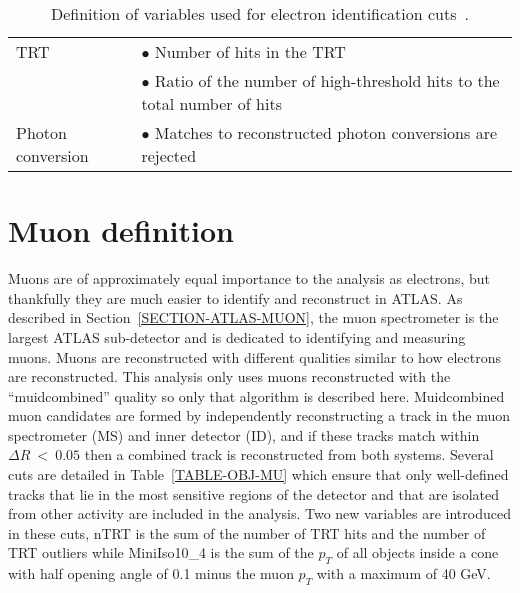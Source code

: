 \begin{table}
\begin{center}
\begin{tabular}{|p{4cm}|p{11cm}|}
\hline
TRT & $\bullet$ Number of hits in the TRT \\
    & $\bullet$ Ratio of the number of high-threshold hits to the total number of hits \\
\hline
Photon conversion & $\bullet$ Matches to reconstructed photon conversions are rejected \\
\hline
\end{tabular}
\caption{Definition of variables used for electron identification cuts~\cite{Electrons}.}
\label{TABLE-OBJ-ELQUALITY}
\end{center}
\end{table}

\section{Muon definition}
\label{SECTION-OBJ-MU}
Muons are of approximately equal importance to the analysis as electrons, but thankfully they are much easier to identify and reconstruct in ATLAS. As described in Section~\ref{SECTION-ATLAS-MUON}, the muon spectrometer is the largest ATLAS sub-detector and is dedicated to identifying and measuring muons. Muons are reconstructed with different qualities similar to how electrons are reconstructed. This analysis only uses muons reconstructed with the ``muidcombined'' quality so only that algorithm is described here. Muidcombined muon candidates are formed by independently reconstructing a track in the muon spectrometer (MS) and inner detector (ID), and if these tracks match within $\Delta R\ <\ 0.05$ then a combined track is reconstructed from both systems. Several cuts are detailed in Table~\ref{TABLE-OBJ-MU} which ensure that only well-defined tracks that lie in the most sensitive regions of the detector and that are isolated from other activity are included in the analysis. Two new variables are introduced in these cuts, nTRT is the sum of the number of TRT hits and the number of TRT outliers while MiniIso10\_4 is the sum of the $p_T$ of all objects inside a cone with half opening angle of 0.1 minus the muon $p_T$ with a maximum of 40 GeV.

